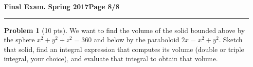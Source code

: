 \documentclass[12pt]{article}
\theoremstyle{definition}
\newtheorem{problem}{Problem}
\begin{document}
\hfill{\large\bf Final Exam.}\hfill{\large\bf
  Spring 2017}\hfill{\large\bf Page 8/8}\hrule

\bigskip
\begin{problem}[10 pts]
We want to find the volume of the solid bounded above by the sphere $x^2+y^2+z^2=360$ and below by the paraboloid $2x = x^2+y^2$. Sketch that solid, find an integral expression that computes its volume (double or triple integral, your choice), and evaluate that integral to obtain that volume.
\vspace{19cm}
\begin{flushright}
\end{flushright}
\end{problem}
\end{document}
